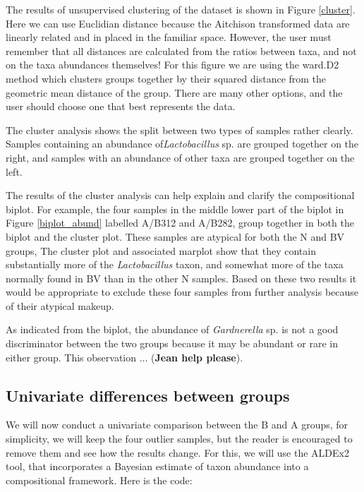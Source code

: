 \documentclass[11pt]{article}\usepackage[]{graphicx}\usepackage[]{color}
\begin{document}
The results of unsupervised clustering of the dataset is shown in Figure \ref{cluster}. Here we can use Euclidian distance because the Aitchison transformed data are linearly related and in placed in the familiar space. However, the user must remember that all distances are calculated from the ratios between taxa, and not on the taxa abundances themselves! For this figure we are using the ward.D2 method which clusters groups together by their squared distance from the geometric mean distance of the group. There are many other options, and the user should choose one that best represents the data. 

The cluster analysis shows the split between two types of samples rather clearly. Samples containing an abundance of\emph{Lactobacillus} sp. are grouped together on the right, and samples with an abundance of other taxa are grouped together on the left. 

The results of the cluster analysis can help explain and clarify the compositional biplot. For example, the four samples in the middle lower part of the biplot in Figure \ref{biplot_abund} labelled A/B312 and A/B282, group together in both the biplot and the cluster plot. These samples are atypical for both the N and BV groups, The cluster plot and associated marplot show that they contain substantially more of the \emph{Lactobacillus} taxon, and somewhat more of the taxa normally found in BV than in the other N samples. Based on these two results it would be appropriate to exclude these four samples from further analysis because of their atypical makeup. 

As indicated from the biplot, the abundance of \emph{Gardnerella} sp. is not a good  discriminator between the  two groups because it may be abundant or rare in either group. This observation ... (\textbf{Jean help please}).

\subsection{Univariate differences between groups}

We will now conduct a univariate comparison between the B and A groups, for simplicity, we will keep the four outlier samples, but the reader is encouraged to remove them and see how the results change. For this, we will use the ALDEx2 tool, that incorporates a Bayesian estimate of taxon abundance into a compositional framework. Here is the code:
\end{document}
